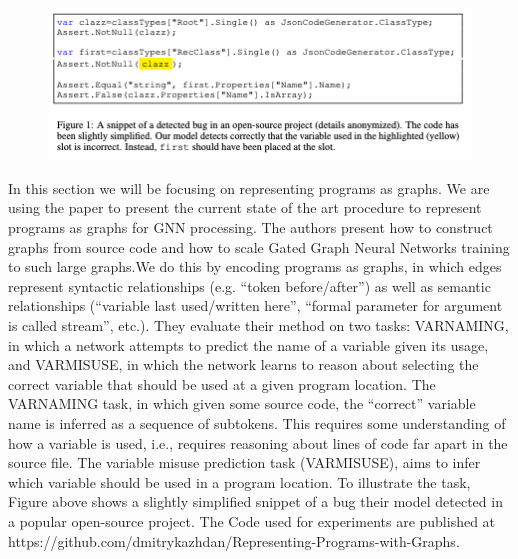 \documentclass{article}
\begin{document}
\begin{figure}[ht]
\vskip 0.2in
\begin{center}
\centerline{\includegraphics[width=\columnwidth]{Images/Background1.png}}
\label{icml-historical}
\end{center}
\vskip -0.2in
\end{figure}
In this section we will be focusing on representing programs as graphs. We are using the paper \cite{allamanis2017learning} to present the current state of the art procedure to represent programs as graphs for GNN processing. The authors present how to construct graphs from source code and how to scale Gated Graph Neural Networks training to such large graphs.We do this by encoding programs as graphs, in which edges represent syntactic relationships (e.g. “token before/after”) as well as semantic relationships (“variable last used/written here”, “formal parameter for argument is called stream”, etc.). They evaluate their method on two tasks: VARNAMING, in which a network attempts to predict the name of a variable given its usage, and VARMISUSE, in which the network learns to reason about selecting the correct variable that should be used at a given program location. The VARNAMING task, in which given some source code, the “correct” variable name is inferred as a sequence of subtokens. This requires some understanding of how a variable is used, i.e., requires reasoning about lines of code far apart in the source file. The variable misuse prediction task (VARMISUSE), aims to infer which variable should be used in a program location. To illustrate the task, Figure above shows a slightly simplified snippet of a bug their model detected in a popular open-source project. The Code used for experiments are published at https://github.com/dmitrykazhdan/Representing-Programs-with-Graphs.
\end{document}

